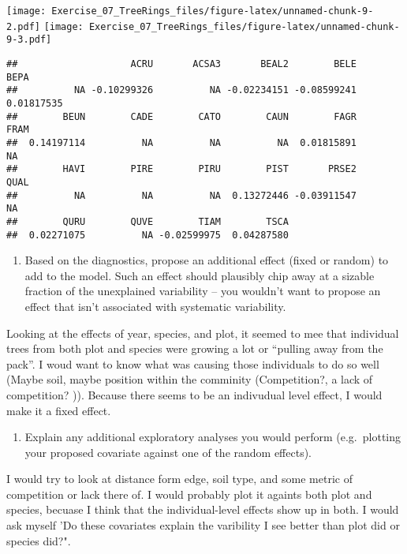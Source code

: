 \documentclass[]{article}
\providecommand{\tightlist}{%
  \setlength{\itemsep}{0pt}\setlength{\parskip}{0pt}}
\begin{document}
\texttt{[image: Exercise\_07\_TreeRings\_files/figure-latex/unnamed-chunk-9-2.pdf]}
\texttt{[image: Exercise\_07\_TreeRings\_files/figure-latex/unnamed-chunk-9-3.pdf]}

\begin{verbatim}
##                    ACRU       ACSA3       BEAL2        BELE        BEPA 
##          NA -0.10299326          NA -0.02234151 -0.08599241  0.01817535 
##        BEUN        CADE        CATO        CAUN        FAGR        FRAM 
##  0.14197114          NA          NA          NA  0.01815891          NA 
##        HAVI        PIRE        PIRU        PIST       PRSE2        QUAL 
##          NA          NA          NA  0.13272446 -0.03911547          NA 
##        QURU        QUVE        TIAM        TSCA 
##  0.02271075          NA -0.02599975  0.04287580
\end{verbatim}

\begin{enumerate}
\def\labelenumi{\arabic{enumi}.}
\setcounter{enumi}{2}
\tightlist
\item
  Based on the diagnostics, propose an additional effect (fixed or
  random) to add to the model. Such an effect should plausibly chip away
  at a sizable fraction of the unexplained variability -- you wouldn't
  want to propose an effect that isn't associated with systematic
  variability.
\end{enumerate}

Looking at the effects of year, species, and plot, it seemed to mee that
individual trees from both plot and species were growing a lot or
``pulling away from the pack''. I woud want to know what was causing
those individuals to do so well (Maybe soil, maybe position within the
comminity (Competition?, a lack of competition? )). Because there seems
to be an indivudual level effect, I would make it a fixed effect.

\begin{enumerate}
\def\labelenumi{\arabic{enumi}.}
\setcounter{enumi}{3}
\tightlist
\item
  Explain any additional exploratory analyses you would perform
  (e.g.~plotting your proposed covariate against one of the random
  effects).
\end{enumerate}

I would try to look at distance form edge, soil type, and some metric of
competition or lack there of. I would probably plot it againts both plot
and species, becuase I think that the individual-level effects show up
in both. I would ask myself 'Do these covariates explain the varibility
I see better than plot did or species did?".
\end{document}
